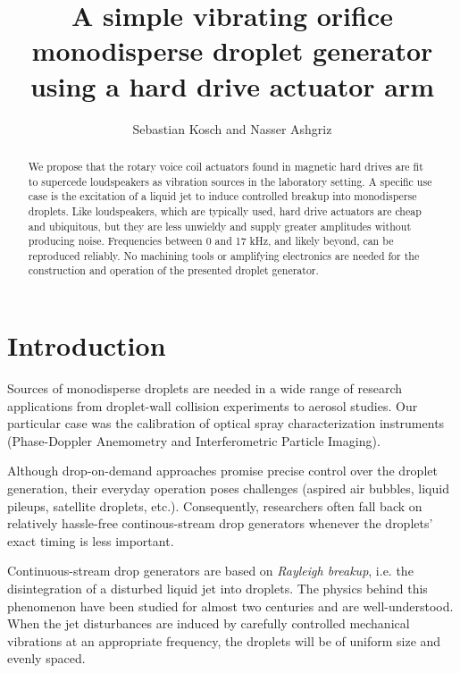 \documentclass[aip,rsi,reprint,graphicx]{revtex4-1} %
\begin{document}
\title{A simple vibrating orifice monodisperse droplet generator using a hard
drive actuator arm}
\author{Sebastian Kosch and Nasser Ashgriz}
\begin{abstract}
    We propose that the rotary voice coil actuators found in magnetic hard drives are
    fit to supercede loudspeakers as vibration sources in the laboratory setting. A
    specific use case is the excitation of a liquid jet to induce controlled
    breakup into monodisperse droplets. Like loudspeakers, which are typically
    used, hard drive actuators are cheap and ubiquitous, but they are less
    unwieldy and supply greater amplitudes without producing noise. Frequencies
    between 0 and 17 kHz, and likely beyond, can be reproduced reliably. No machining
    tools or amplifying electronics are needed for the construction and
    operation of the presented droplet generator.
\end{abstract}
\maketitle
\section{Introduction}
Sources of monodisperse droplets are needed in a wide range of research
applications from droplet-wall collision experiments\cite{Mundo95} to aerosol
studies\cite{Liu74}. Our particular case was the calibration of optical spray
characterization instruments (Phase-Doppler Anemometry and Interferometric
Particle Imaging).

Although drop-on-demand approaches promise precise control over the droplet
generation, their everyday operation poses challenges (aspired air bubbles,
liquid pileups, satellite droplets, etc.). Consequently, researchers often fall
back on relatively hassle-free continous-stream drop generators whenever the
droplets' exact timing is less important.

Continuous-stream drop generators are based on \emph{Rayleigh breakup},
i.e. the disintegration of a disturbed liquid jet into droplets. The physics
behind this phenomenon have been studied for almost two centuries\cite{Savart33,
Rayleigh79} and are well-understood. When the jet disturbances are induced by
carefully controlled mechanical vibrations at an appropriate frequency, the
droplets will be of uniform size and evenly spaced.
\end{document}
